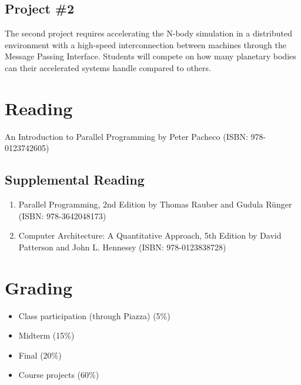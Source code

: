 \documentclass[12pt,a4paper,oneside]{article}
\begin{document}
        \subsection{Project \#2}

            The second project requires accelerating the N-body simulation in a
            distributed environment with a high-speed interconnection between
            machines through the Message Passing Interface. Students will
            compete on how many planetary bodies can their accelerated systems
            handle compared to others.

    \section{Reading}

        An Introduction to Parallel Programming by Peter Pacheco (ISBN:
        978-0123742605)

        \subsection{Supplemental Reading}

            \begin{enumerate}
                \item Parallel Programming, 2nd Edition by Thomas Rauber and
                Gudula Rünger (ISBN: 978-3642048173)
                \item Computer Architecture: A Quantitative Approach, 5th
                Edition by David Patterson and John L. Hennessy (ISBN:
                978-0123838728)
            \end{enumerate}

    \section{Grading}

        \begin{itemize}
            \item Class participation (through Piazza) (5\%)
            \item Midterm (15\%)
            \item Final (20\%)
            \item Course projects (60\%)
        \end{itemize}
\end{document}
